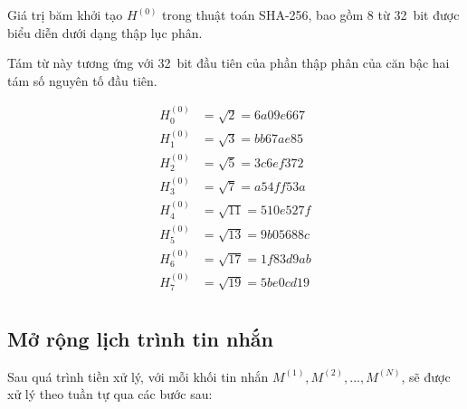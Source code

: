 Giá trị băm khởi tạo $H^{(0)}$ trong thuật toán SHA-256, bao gồm 8 từ 32~bit được biểu diễn dưới dạng thập lục phân.

Tám từ này tương ứng với 32~bit đầu tiên của phần thập phân của căn bậc hai tám số nguyên tố đầu tiên. 

\begin{align*}
	H_0^{(0)} &= \sqrt{2} = 6a09e667 \\
	H_1^{(0)} &= \sqrt{3} = bb67ae85 \\
	H_2^{(0)} &= \sqrt{5} = 3c6ef372 \\
	H_3^{(0)} &= \sqrt{7} = a54ff53a \\
	H_4^{(0)} &= \sqrt{11} = 510e527f \\
	H_5^{(0)} &= \sqrt{13} = 9b05688c \\
	H_6^{(0)} &= \sqrt{17} = 1f83d9ab \\
	H_7^{(0)} &= \sqrt{19} = 5be0cd19 \\	
\end{align*}

\subsection{Mở rộng lịch trình tin nhắn}

Sau quá trình tiền xử lý, với mỗi khối tin nhắn $M^{(1)}, M^{(2)},...,M^{(N)}$, sẽ được xử lý theo tuần tự qua các bước sau:

